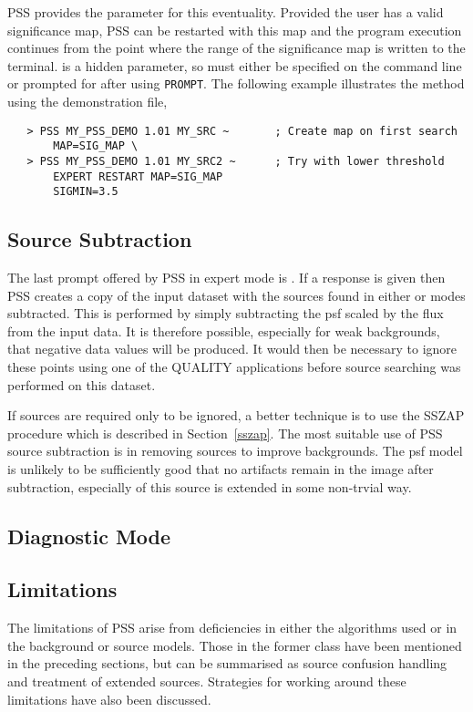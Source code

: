 PSS provides the  parameter for this eventuality. Provided
the user has a valid significance map, PSS can be restarted with this map
and the program execution continues from the point where the range of the
significance map is written to the terminal.  is a hidden
parameter, so must either be specified on the command line or prompted for
after using \verb+PROMPT+. The following example illustrates the method
using the demonstration file,
\begin{verbatim}
   > PSS MY_PSS_DEMO 1.01 MY_SRC ~       ; Create map on first search
       MAP=SIG_MAP \
   > PSS MY_PSS_DEMO 1.01 MY_SRC2 ~      ; Try with lower threshold
       EXPERT RESTART MAP=SIG_MAP
       SIGMIN=3.5
\end{verbatim}


\subsection{Source Subtraction}
\label{pss:ref:ssub}
The last prompt offered by PSS in expert mode is . If a 
response is given then PSS creates a copy of the input dataset with
the sources found in either \mode{SEARCH} or \mode{PARAM} modes
subtracted. This is performed by simply subtracting the psf scaled
by the flux from the input data. It is therefore possible, especially
for weak backgrounds, that negative data values will be produced. It
would then be necessary to ignore these points using one of the QUALITY
applications before source searching was performed on this dataset.

If sources are required only to be ignored, a better technique is
to use the SSZAP procedure which is described in Section~\ref{sszap}.
The most suitable use of PSS source subtraction is in removing
sources to improve backgrounds. The psf model is unlikely to be
sufficiently good that no artifacts remain in the image after
subtraction, especially of this source is extended in some non-trvial
way.


\subsection{Diagnostic Mode}


\subsection{Limitations}

The limitations of PSS arise from deficiencies in either the
algorithms used or in the background or source models. Those
in the former class have been mentioned in the preceding sections,
but can be summarised as source confusion handling and treatment
of extended sources. Strategies for working around these limitations
have also been discussed.

